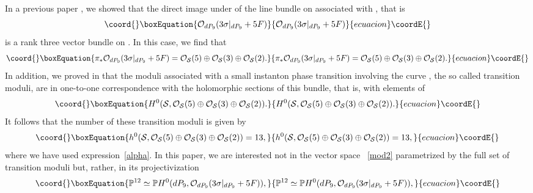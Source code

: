 \documentclass[a4paper,12pt]{article}
\numberwithin{equation}{section}
\theoremstyle{plain}
\begin{document}
In a previous paper
\cite{BDOold}, we showed that the direct image under \myHighlight{$\pi$}\coordHE{} of the line
bundle
on \coordHE{} associated with \coordHE{}, that is
%
\begin{equation}\coord{}\boxEquation{
{\cal O}_{dP_9}(3 \sigma|_{dP_9} + 5 F)
\label{46}
}{
{\cal O}_{dP_9}(3 \sigma|_{dP_9} + 5 F)
}{ecuacion}\coordE{}\end{equation}
%
is a rank three vector bundle on \coordHE{}. In this case, we find that
%
\begin{equation}\coord{}\boxEquation{
\pi_{*} {\cal O}_{dP_9} (3 \sigma|_{dP_9} + 5F) =
{\cal O}_{{\cal S}}(5) \oplus {\cal O}_{{\cal S}}(3) \oplus
{\cal O}_{{\cal S}}(2).
\label{mod1}
}{
\pi_{*} {\cal O}_{dP_9} (3 \sigma|_{dP_9} + 5F) =
{\cal O}_{{\cal S}}(5) \oplus {\cal O}_{{\cal S}}(3) \oplus
{\cal O}_{{\cal S}}(2).
}{ecuacion}\coordE{}\end{equation}
%
In addition, we proved in \cite{BDOold} that the moduli associated with
a small instanton phase transition involving the curve \coordHE{},
the so called transition moduli, are in one-to-one
correspondence with the holomorphic sections of this bundle, that is,
with elements of
%
\begin{equation}\coord{}\boxEquation{
H^{0}({\cal S}, {\cal O}_{{\cal S}}(5) \oplus {\cal O}_{{\cal S}}(3)
\oplus
{\cal O}_{{\cal S}}(2)).
\label{mod2}
}{
H^{0}({\cal S}, {\cal O}_{{\cal S}}(5) \oplus {\cal O}_{{\cal S}}(3)
\oplus
{\cal O}_{{\cal S}}(2)).
}{ecuacion}\coordE{}\end{equation}
%
It follows that the number of these transition moduli is given by
%
\begin{equation}\coord{}\boxEquation{
h^{0}({\cal S}, {\cal O}_{{\cal S}}(5) \oplus {\cal O}_{{\cal S}}(3)
\oplus {\cal O}_{{\cal S}}(2)) =13,
\label{47}
}{
h^{0}({\cal S}, {\cal O}_{{\cal S}}(5) \oplus {\cal O}_{{\cal S}}(3)
\oplus {\cal O}_{{\cal S}}(2)) =13,
}{ecuacion}\coordE{}\end{equation}
where we have used expression~\eqref{alpha}.
In this paper, we are interested not in the
vector space ~\eqref{mod2} parametrized by the
full set of transition moduli but,
rather, in its projectivization
%
\begin{equation}\coord{}\boxEquation{
{\mathbb P}^{12} \simeq  {\mathbb P}H^{0}(dP_9, {\cal O}_{dP_9}(3
\sigma|_{dP_9} +5F)),
\label{rock4}
}{
{\mathbb P}^{12} \simeq  {\mathbb P}H^{0}(dP_9, {\cal O}_{dP_9}(3
\sigma|_{dP_9} +5F)),
}{ecuacion}\coordE{}\end{equation}
\end{document}
